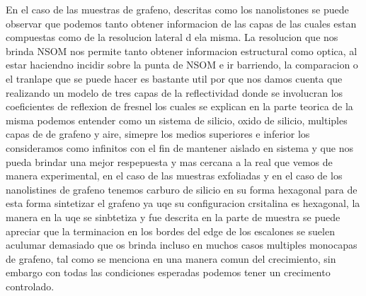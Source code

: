 En el caso de las muestras de grafeno, descritas como los nanolistones se puede observar que podemos tanto obtener informacion de las capas de las cuales estan compuestas como de la resolucion lateral d ela misma. 
La resolucion que nos brinda NSOM nos permite tanto obtener informacion estructural como optica, al estar haciendno incidir sobre la punta de NSOM e ir barriendo, la comparacion o el tranlape que se puede hacer es bastante util por que nos damos cuenta que realizando un modelo de tres capas de la reflectividad donde se involucran los coeficientes de reflexion de fresnel los cuales se explican en la parte teorica de la misma podemos entender como un sistema de silicio, oxido de silicio, multiples capas de  de grafeno y aire, simepre los medios superiores e inferior los consideramos como infinitos con el fin de mantener aislado en sistema y que nos pueda brindar una mejor respepuesta y mas cercana a la real que vemos de manera experimental,  en el caso de las muestras exfoliadas y en el caso de los nanolistines de grafeno tenemos carburo de silicio en su forma hexagonal para de esta forma sintetizar el grafeno ya uqe su configuracion crsitalina es hexagonal, la manera en la uqe se sinbtetiza y fue descrita en la parte de muestra se puede apreciar que la terminacion en los bordes del edge de los escalones se suelen aculumar demasiado que os brinda incluso en muchos casos multiples monocapas de grafeno, tal como se menciona en una manera comun del crecimiento, sin embargo con todas las condiciones esperadas podemos tener un crecimento controlado.

